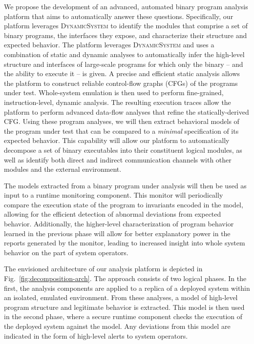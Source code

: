 \documentclass[letterpaper,twoside,11pt,headings=small]{scrartcl}
\newcommand{\dynamicsys}{\textsc{DynamicSystem}\xspace}
\begin{document}
We propose the development of an advanced, automated binary program analysis
platform that aims to automatically answer these questions.  Specifically, our
platform leverages \dynamicsys to identify the modules that comprise a set of
binary programs, the interfaces they expose, and characterize their structure
and expected behavior.  The platform leverages \dynamicsys and uses a
combination of static and dynamic analyses to automatically infer the
high-level structure and interfaces of large-scale programs for which only the
binary -- and the ability to execute it -- is given.  A precise and efficient
static analysis allows the platform to construct reliable control-flow graphs
(CFGs) of the programs under test.  Whole-system emulation is then used to
perform fine-grained, instruction-level, dynamic analysis.  The resulting
execution traces allow the platform to perform advanced data-flow analyses
that refine the statically-derived CFG.  Using these program analyses, we will
then extract behavioral models of the program under test that can be compared
to a
\emph{minimal} specification of its expected behavior.  This capability will
allow our platform to automatically decompose a set of binary executables into
their constituent logical modules, as well as identify both direct and
indirect communication channels with other modules and the external
environment.

The models extracted from a binary program under analysis will then be used as
input to a runtime monitoring component.  This monitor will periodically
compare the execution state of the program to invariants encoded in the model,
allowing for the efficient detection of abnormal deviations from expected
behavior.  Additionally, the higher-level characterization of program behavior
learned in the previous phase will allow for better explanatory power in the
reports generated by the monitor, leading to increased insight into whole
system behavior on the part of system operators.

The envisioned architecture of our analysis platform is depicted in
Fig.~\ref{fig:decomposition-arch}.  The approach consists of two logical
phases.  In the first, the analysis components are applied to a replica of a
deployed system within an isolated, emulated environment.  From these
analyses, a model of high-level program structure and legitimate behavior is
extracted.  This model is then used in the second phase, where a secure
runtime component checks the execution of the deployed system against the
model.  Any deviations from this model are indicated in the form of high-level
alerts to system operators.
\end{document}
